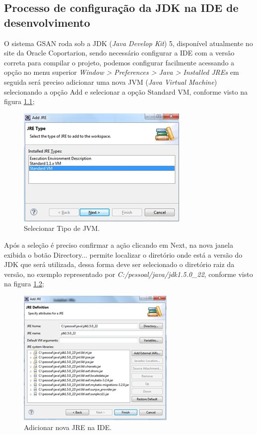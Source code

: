 \begin{anexosenv}

\partanexos

\chapter{Processo de configuração da JDK na IDE de desenvolvimento}

O sistema GSAN roda sob a JDK (\textit{Java Develop Kit}) 5, disponível atualmente no site da Oracle Coportarion, sendo necessário configurar a IDE com a versão correta para compilar o projeto, podemos configurar facilmente acessando a opção no menu superior \textit{Window > Preferences > Java > Installed JREs} em seguida será preciso adicionar uma nova JVM (\textit{Java Virtual Machine}) selecionando a opção Add e selecionar a opção Standard VM, conforme visto na figura \ref{figura:anexo1};

\begin{figure}[H]
	\centering
	\caption{Selecionar Tipo de JVM.}
	\label{figura:anexo1}
	\includegraphics{figuras/anexo/selectJVM.png}
\end{figure}

Após a seleção é preciso confirmar a ação clicando em Next, na nova janela exibida o botão Directory... permite localizar o diretório onde está a versão do JDK que será utilizada, dessa forma deve ser selecionado o diretório raiz da versão, no exemplo representado por \textit{C:/pessoal/java/jdk1.5.0\_22}, conforme visto na figura \ref{figura:anexo2};

\begin{figure}[H]
	\centering
	\caption{Adicionar nova JRE na IDE.}
	\label{figura:anexo2}
	\includegraphics{figuras/anexo/addJRE.png}
\end{figure}


\end{anexosenv}
